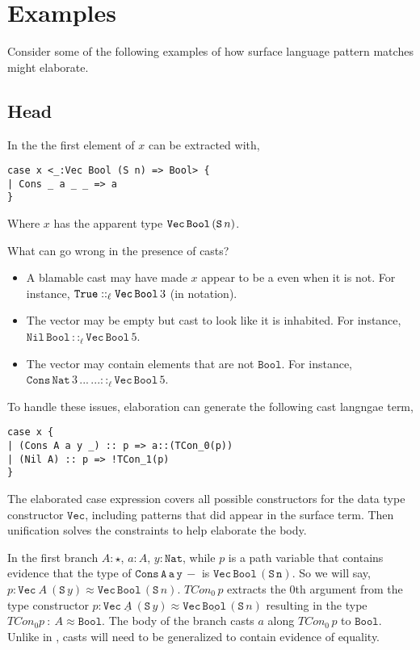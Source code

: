 \section{Examples}
 
Consider some of the following examples of how surface language pattern matches might elaborate.
 
\subsection{Head}
 
In the \slang{} the first element of $x$ can be extracted with,
 
\begin{lstlisting}[basicstyle={\ttfamily\small}]
case x <_:Vec Bool (S n) => Bool> {
| Cons _ a _ _ => a
}
\end{lstlisting}

Where $x$ has the apparent type $\mathtt{Vec}{}\,\mathtt{Bool}{}\,(\mathtt{S}\,n)$.

What can go wrong in the presence of casts?
\begin{itemize}
\item
A blamable cast may have made $x$ appear to be a \Vect{} even when it is not.
For instance, $\mathtt{True}{}::_{\ell}\mathtt{Vec}{}\,\mathtt{Bool}{}\,3$ (in  notation).
\item
The vector may be empty but cast to look like it is inhabited.
For instance, $\mathtt{Nil}\,\mathtt{Bool}\,::_{\ell}\mathtt{Vec}\,\mathtt{Bool}\,5$.
\item
The vector may contain elements that are not $\mathtt{Bool}$.
For instance, $\mathtt{Cons}\,\mathtt{Nat}\,3\,...\,...::_{\ell}\mathtt{Vec}\,\mathtt{Bool}\,5$.
\end{itemize}
 
To handle these issues, elaboration can generate the following cast langngae term,
 
\begin{lstlisting}[basicstyle={\ttfamily\small}]
case x {
| (Cons A a y _) :: p => a::(TCon_0(p))
| (Nil A) :: p => !TCon_1(p)
}
\end{lstlisting}
 
The elaborated case expression covers all possible constructors for the data type constructor $\mathtt{Vec}$, including patterns that did appear in the surface term.
Then unification solves the constraints to help elaborate the body.
 
In the first branch $A:\star$, $a:A$, $y:\mathtt{Nat}$, while $p$ is a path variable that contains evidence that the type of $\mathtt{Cons\,A\,a\,y\,-}$ is $\mathtt{Vec\,Bool\,(S\,n)}$.
So we will say, $p:\mathtt{Vec}\ A\ (\mathtt{S}\,y)\approx\mathtt{Vec}\,\mathtt{Bool}\,(\mathtt{S}\,n)$.
$TCon_{0}\,p$ extracts the 0th argument from the type constructor $p:\mathtt{Vec}\ \underline{A}\ (\mathtt{S}\,y)\approx\mathtt{Vec}\,\underline{\mathtt{Bool}}\,(\mathtt{S}\,n)$ resulting in the type $TCon_{0}p\ :\ A\approx\mathtt{Bool}$.
The body of the branch casts $a$ along $TCon_{0}\,p$ to $\mathtt{Bool}$.
Unlike in , casts will need to be generalized to contain evidence of equality.
 
